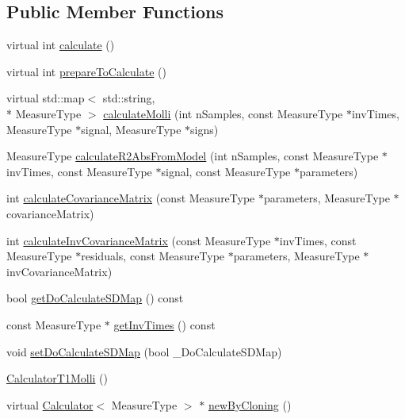 \subsection*{Public Member Functions}
\begin{DoxyCompactItemize}
\item 
virtual int \hyperlink{class_ox_1_1_calculator_t1_molli_a6f15bc9c026305248c927d62748903bf}{calculate} ()
\item 
virtual int \hyperlink{class_ox_1_1_calculator_t1_molli_a591ec9658fb5a3e4f48715057cf62b38}{prepare\-To\-Calculate} ()
\item 
virtual std\-::map$<$ std\-::string, \\*
Measure\-Type $>$ \hyperlink{class_ox_1_1_calculator_t1_molli_ac275f14715caf983839e13f89a87e8d1}{calculate\-Molli} (int n\-Samples, const Measure\-Type $\ast$inv\-Times, Measure\-Type $\ast$signal, Measure\-Type $\ast$signs)
\item 
Measure\-Type \hyperlink{class_ox_1_1_calculator_t1_molli_a9c9238dd8a96e06d3e0a96810377b90b}{calculate\-R2\-Abs\-From\-Model} (int n\-Samples, const Measure\-Type $\ast$inv\-Times, const Measure\-Type $\ast$signal, const Measure\-Type $\ast$parameters)
\item 
int \hyperlink{class_ox_1_1_calculator_t1_molli_a030582bca754a7b81febfae53fe0c10c}{calculate\-Covariance\-Matrix} (const Measure\-Type $\ast$parameters, Measure\-Type $\ast$covariance\-Matrix)
\item 
int \hyperlink{class_ox_1_1_calculator_t1_molli_aec374fc512aa3b109138f0c16c53a171}{calculate\-Inv\-Covariance\-Matrix} (const Measure\-Type $\ast$inv\-Times, const Measure\-Type $\ast$residuals, const Measure\-Type $\ast$parameters, Measure\-Type $\ast$inv\-Covariance\-Matrix)
\item 
bool \hyperlink{class_ox_1_1_calculator_t1_molli_a06d8579492ee063b129b489e638333be}{get\-Do\-Calculate\-S\-D\-Map} () const 
\item 
const Measure\-Type $\ast$ \hyperlink{class_ox_1_1_calculator_t1_molli_af0ec071b9742038460f2987d24182030}{get\-Inv\-Times} () const 
\item 
void \hyperlink{class_ox_1_1_calculator_t1_molli_a65a51dcadaafdefc576201de535f8810}{set\-Do\-Calculate\-S\-D\-Map} (bool \-\_\-\-Do\-Calculate\-S\-D\-Map)
\item 
\hyperlink{class_ox_1_1_calculator_t1_molli_ab1892de078822ea106fcaebcf81047be}{Calculator\-T1\-Molli} ()
\item 
virtual \hyperlink{class_ox_1_1_calculator}{Calculator}$<$ Measure\-Type $>$ $\ast$ \hyperlink{class_ox_1_1_calculator_t1_molli_a2a924ff09d446b51542dc246a6a04bd3}{new\-By\-Cloning} ()
\end{DoxyCompactItemize}
